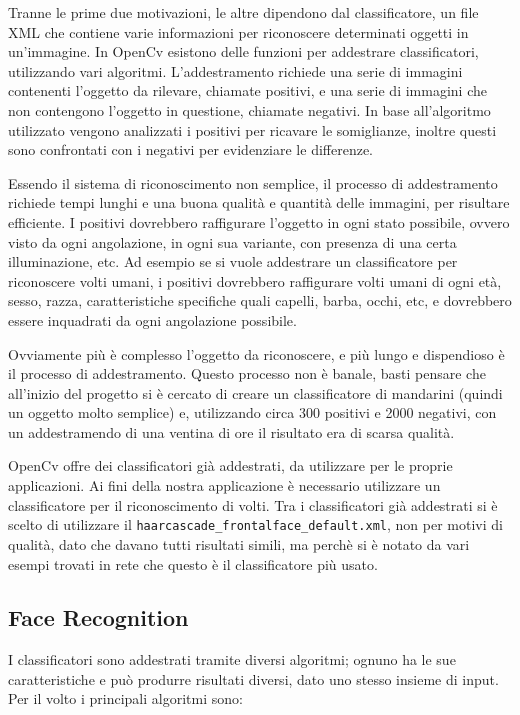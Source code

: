 Tranne le prime due motivazioni, le altre dipendono dal classificatore, un file XML che contiene varie informazioni per riconoscere determinati oggetti in un'immagine. In OpenCv esistono delle funzioni per addestrare classificatori, utilizzando vari algoritmi. L'addestramento richiede una serie di immagini contenenti l'oggetto da rilevare, chiamate positivi, e una serie di immagini che non contengono l'oggetto in questione, chiamate negativi. In base all'algoritmo utilizzato vengono analizzati i positivi per ricavare le somiglianze, inoltre questi sono confrontati con i negativi per evidenziare le differenze.

Essendo il sistema di riconoscimento non semplice, il processo di addestramento richiede tempi lunghi e una buona qualità e quantità delle immagini, per risultare efficiente. I positivi dovrebbero raffigurare l'oggetto in ogni stato possibile, ovvero visto da ogni angolazione, in ogni sua variante, con presenza di una certa illuminazione, etc. Ad esempio se si vuole addestrare un classificatore per riconoscere volti umani, i positivi dovrebbero raffigurare volti umani di ogni età, sesso, razza, caratteristiche specifiche quali capelli, barba, occhi, etc, e dovrebbero essere inquadrati da ogni angolazione possibile.

Ovviamente più è complesso l'oggetto da riconoscere, e più lungo e dispendioso è il processo di addestramento. Questo processo non è banale, basti pensare che all'inizio del progetto si è cercato di creare un classificatore di mandarini (quindi un oggetto molto semplice) e, utilizzando circa 300 positivi e 2000 negativi, con un addestramendo di una ventina di ore il risultato era di scarsa qualità.

OpenCv offre dei classificatori già addestrati, da utilizzare per le proprie applicazioni.
Ai fini della nostra applicazione è necessario utilizzare un classificatore per il riconoscimento di volti. Tra i classificatori già addestrati si è scelto di utilizzare il \texttt{haarcascade\_frontalface\_default.xml}, non per motivi di qualità, dato che davano tutti risultati simili, ma perchè si	 è notato da vari esempi trovati in rete che questo è il classificatore più usato.

\subsection{Face Recognition}
I classificatori sono addestrati tramite diversi algoritmi; ognuno ha le sue caratteristiche e può produrre risultati diversi, dato uno stesso insieme di input. Per il volto i principali algoritmi sono:

